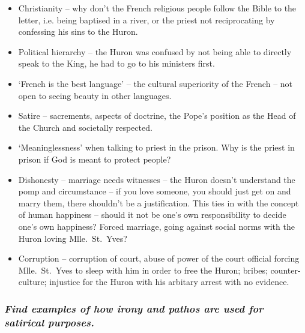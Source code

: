 \documentclass[12pt]{article}
\begin{document}
\begin{itemize}
  \item{Christianity -- why don't the French religious people follow the Bible to the letter, i.e. being baptised in a river, or the priest not reciprocating by confessing his sins to the Huron.}
  \item{Political hierarchy -- the Huron was confused by not being able to directly speak to the King, he had to go to his ministers first.}
  \item{`French is the best language' -- the cultural superiority of the French -- not open to seeing beauty in other languages.}
  \item{Satire -- sacrements, aspects of doctrine, the Pope's position as the Head of the Church and societally respected.}
  \item{`Meaninglessness' when talking to priest in the prison. Why is the priest in prison if God is meant to protect people?}
  \item{Dishonesty -- marriage needs witnesses -- the Huron doesn't understand the pomp and circumstance -- if you love someone, you should just get on and marry them, there shouldn't be a justification. This ties in with the concept of human happiness -- should it not be one's own responsibility to decide one's own happiness? Forced marriage, going against social norms with the Huron loving Mlle.\ St.\ Yves?}
  \item{Corruption -- corruption of court, abuse of power of the court official forcing Mlle.\ St.\ Yves to sleep with him in order to free the Huron; bribes; counter-culture; injustice for the Huron with his arbitary arrest with no evidence.}
\end{itemize}

\subsubsection*{\textit{Find examples of how irony and pathos are used for satirical purposes.}}
\end{document}
